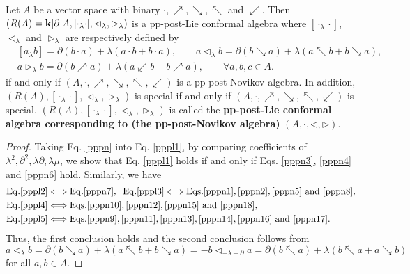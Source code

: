 \documentclass[12pt]{amsart}
\begin{document}
\begin{proposition}\label{pppl-n}
Let $A$ be a vector space with binary
 $\cdot,\nearrow,\searrow,\nwarrow$ and $\swarrow$.  Then $(R(A)={\bf k}[\partial ]A, [\cdot_\lambda \cdot], \lhd_\lambda, \rhd_\lambda)$ is a pp-post-Lie conformal algebra where $[\cdot_\lambda \cdot]$,  $\lhd_\lambda$ and $ \rhd_\lambda$ are respectively defined by
\begin{equation}\label{pppn}
    \begin{aligned}
        &[a_\lambda b]=\partial(b\cdot a)+\lambda(a\cdot b+b\cdot a),   \qquad   a\lhd_\lambda b=\partial(b\searrow a)+\lambda(a\nwarrow b+b\searrow a),   \\
        & a \rhd_\lambda b=\partial(b\nearrow a)+\lambda(a\swarrow b+b\nearrow a),  \qquad\forall a,b,c\in A.
    \end{aligned}
\end{equation}
if and only if  $(A,\cdot,\nearrow,\searrow,\nwarrow,\swarrow)$  is a pp-post-Novikov algebra. In addition,  $(R(A),[\cdot_\lambda \cdot],\lhd_\lambda, \rhd_\lambda)$ is special if and only if $(A,\cdot,\nearrow,\searrow,\nwarrow,\swarrow)$ is special. $(R(A),[\cdot_\lambda \cdot],\lhd_\lambda, \rhd_\lambda)$ is called the {\bf pp-post-Lie conformal algebra corresponding to (the pp-post-Novikov algebra) } $(A,\cdot,\lhd,\rhd)$.
\end{proposition}
\begin{proof}
Taking Eq. \eqref{pppn} into Eq. \eqref{pppl1}, by comparing
coefficients of $\lambda^2,\partial^2,\lambda\partial,
\lambda\mu$, we show that Eq. \eqref{pppl1} holds if and only if
Eqs. \eqref{pppn3}, \eqref{pppn4} and \eqref{pppn6} hold.
Similarly, we have
\begin{align*}
    & {\rm Eq.} \eqref{pppl2}  \Longleftrightarrow {\rm Eq.} \eqref{pppn7},\;\;
    {\rm Eq.} \eqref{pppl3}\Longleftrightarrow {\rm Eqs.} \eqref{pppn1}, \eqref{pppn2}, \eqref{pppn5} {\rm~ and~} \eqref{pppn8}, \\
    &  {\rm Eq.} \eqref{pppl4}\Longleftrightarrow  {\rm Eqs.} \eqref{pppn10},\eqref{pppn12},\eqref{pppn15} {\rm ~and ~} \eqref{pppn18},\\
    &{\rm Eq.} \eqref{pppl5} \Longleftrightarrow  {\rm Eqs.} \eqref{pppn9},\eqref{pppn11},\eqref{pppn13},\eqref{pppn14},\eqref{pppn16} {\rm ~and~ }\eqref{pppn17}.
\end{align*}
Thus, the first conclusion holds and the second conclusion follows
from
$$
a\lhd_\lambda b=\partial(b\searrow a)+\lambda(a\nwarrow b+b\searrow a)=-b\lhd_{-\lambda-\partial}a=\partial(b\nwarrow a)+\lambda(b\nwarrow a+a\searrow b)
$$
for all $a,b\in A$.
\end{proof}
\end{document}
